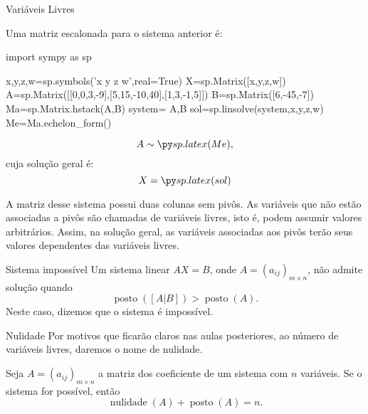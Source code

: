 \begin{frame}[label=sistemas,fragile=singleslide]{Variáveis Livres}

Uma matriz escalonada para o sistema anterior é:

\begin{pycode}
import sympy as sp

x,y,z,w=sp.symbols('x y z w',real=True)
X=sp.Matrix([x,y,z,w])
A=sp.Matrix([[0,0,3,-9],[5,15,-10,40],[1,3,-1,5]])
B=sp.Matrix([6,-45,-7])
Ma=sp.Matrix.hstack(A,B)
system= A,B
sol=sp.linsolve(system,x,y,z,w)
Me=Ma.echelon_form()
\end{pycode}
\[A\sim \pyl{Me},\]
cuja solução geral é:
\[X=\pyl{sol}\]

\begin{block}{}
A matriz desse sistema possui duas colunas sem pivôs. As variáveis que não estão associadas a pivôs são chamadas de {\color{blue} variáveis livres}, isto é, podem assumir valores arbitrários. Assim, na solução geral, as variáveis associadas aos pivôs terão seus valores dependentes das variáveis livres.
\end{block}

\end{frame}

\begin{frame}[label=sistemas]

\begin{block}{Sistema impossível}
Um sistema linear $AX=B$, onde $A=(a_{ij})_{m\times n}$, {\color{red} não admite solução} quando
\[\operatorname{posto}([A|B])>\operatorname{posto}(A).\]
Neste caso, dizemos que {\color{blue}o sistema é impossível}.
\end{block}

\begin{block}{Nulidade}
Por motivos que ficarão claros nas aulas posteriores, ao número de variáveis livres, daremos o nome de {\color{blue} nulidade}.
\end{block}

\begin{teo}
Seja $A=(a_{ij})_{m\times n}$ a matriz dos coeficiente de um sistema com $n$ variáveis. {\color{blue}Se o sistema for possível}, então
\[\operatorname{nulidade}(A)+\operatorname{posto}(A)=n.\]
\end{teo}

%
%

\end{frame}

